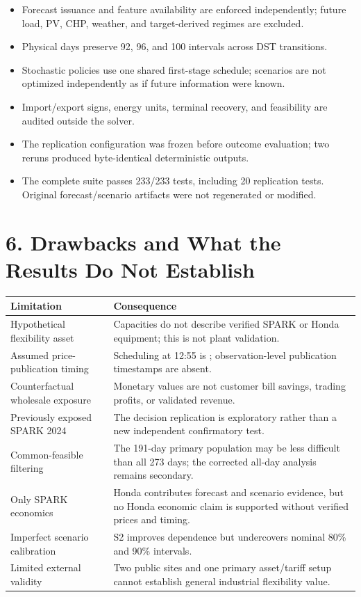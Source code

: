 \documentclass[10pt,a4paper]{article}
\newcommand{\status}[1]{\texttt{\detokenize{#1}}}
\begin{document}
\begin{itemize}
  \item Forecast issuance and feature availability are enforced independently;
  future load, PV, CHP, weather, and target-derived regimes are excluded.
  \item Physical days preserve 92, 96, and 100 intervals across DST transitions.
  \item Stochastic policies use one shared first-stage schedule; scenarios are
  not optimized independently as if future information were known.
  \item Import/export signs, energy units, terminal recovery, and feasibility
  are audited outside the solver.
  \item The replication configuration was frozen before outcome evaluation;
  two reruns produced byte-identical deterministic outputs.
  \item The complete suite passes 233/233 tests, including 20 replication tests.
  Original forecast/scenario artifacts were not regenerated or modified.
\end{itemize}

\newpage
\section*{6. Drawbacks and What the Results Do Not Establish}

\begin{tabularx}{\textwidth}{p{}X}
\toprule
Limitation & Consequence\\
\midrule
Hypothetical flexibility asset & Capacities do not describe verified SPARK or
Honda equipment; this is not plant validation.\\
Assumed price-publication timing & Scheduling at 12:55 is
\status{POST_PUBLICATION_TIMING_ASSUMED}; observation-level publication
timestamps are absent.\\
Counterfactual wholesale exposure & Monetary values are not customer bill
savings, trading profits, or validated revenue.\\
Previously exposed SPARK 2024 & The decision replication is exploratory rather
than a new independent confirmatory test.\\
Common-feasible filtering & The 191-day primary population may be less difficult
than all 273 days; the corrected all-day analysis remains secondary.\\
Only SPARK economics & Honda contributes forecast and scenario evidence, but no
Honda economic claim is supported without verified prices and timing.\\
Imperfect scenario calibration & S2 improves dependence but undercovers nominal
80\% and 90\% intervals.\\
Limited external validity & Two public sites and one primary asset/tariff setup
cannot establish general industrial flexibility value.\\
\bottomrule
\end{tabularx}
\end{document}
